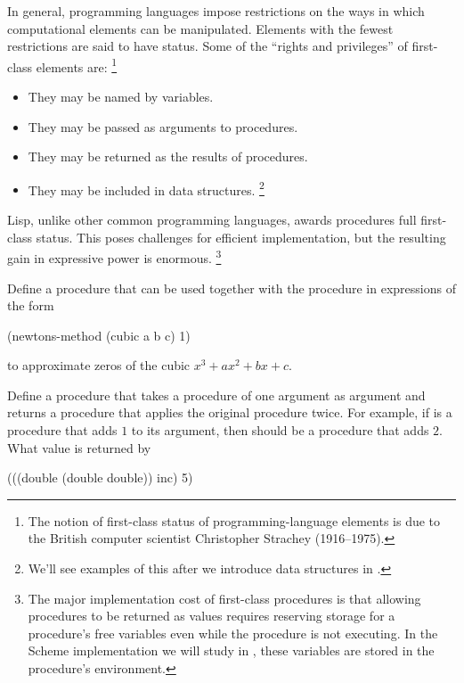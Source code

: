 In general, programming languages impose restrictions on the ways in which computational elements can be manipulated.
Elements with the fewest restrictions are said to have  status.
Some of the “rights and privileges” of first-class elements are:%
\footnote{
	The notion of first-class status of programming-language elements is due to the British computer scientist Christopher Strachey (1916--1975).
}
\begin{itemize}

	\item
		They may be named by variables.

	\item
		They may be passed as arguments to procedures.

	\item
		They may be returned as the results of procedures.

	\item
		They may be included in data structures.%
		\footnote{
			We’ll see examples of this after we introduce data structures in .
		}

\end{itemize}
Lisp, unlike other common programming languages, awards procedures full first-class status.
This poses challenges for efficient implementation, but the resulting gain in expressive power is enormous.%
\footnote{
	The major implementation cost of first-class procedures is that allowing procedures to be returned as values requires reserving storage for a procedure’s free variables even while the procedure is not executing.
	In the Scheme implementation we will study in , these variables are stored in the procedure’s environment.
}



\begin{exercise}
	\label{Exercise 1.40}
	Define a procedure   that can be used together with the  procedure in expressions of the form
	\begin{scheme}
	  (newtons-method (cubic a b c) 1)
	\end{scheme}
	to approximate zeros of the cubic \( x^3 + ax^2 + bx + c \).
\end{exercise}



\begin{exercise}
	\label{Exercise 1.41}
	Define a procedure  that takes a procedure of one argument as argument and returns a procedure that applies the original procedure twice.
	For example, if  is a procedure that adds \( 1 \) to its argument, then  should be a procedure that adds \( 2 \).
	What value is returned by
	\begin{scheme}
	  (((double (double double)) inc) 5)
	\end{scheme}
\end{exercise}



